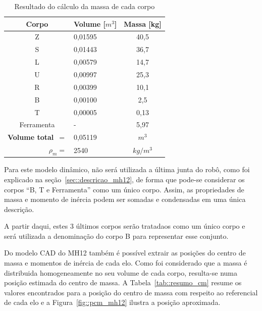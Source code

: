 \begin{table}[h]
\centering
\caption{Resultado do cálculo da massa de cada corpo}
\label{tab::massa_mh12}
\begin{tabular}{@{}clc@{}}
\toprule
\textbf{Corpo}                      & \textbf{Volume} [$m^3$] & \multicolumn{1}{l}{\textbf{Massa} [kg]} \\ \midrule 
Z 									& 0,01595         & 40,5							   \\
S                                   & 0,01443         & 36,7                               \\
L                                   & 0,00579         & 14,7                               \\
U                                   & 0,00997         & 25,3                               \\
R                                   & 0,00399         & 10,1                               \\
B                                   & 0,00100         & 2,5                                \\
T                                   & 0,00005         & 0,13                               \\
Ferramenta                          & -		          & 5,97							   \\ \midrule
\textbf{Volume total}~$=$           & 0,05119        & \multicolumn{1}{c}{$m^3$}	       \\
\multicolumn{1}{r}{\textbf{$\rho_m =$}} & 2540          &
\multicolumn{1}{c}{$kg/{m^3}$}     \\ \bottomrule
\end{tabular}
\end{table}
%

Para este modelo dinâmico, não será utilizada a última junta do robô, como foi
explicado na seção~\ref{sec::descricao_mh12}, de forma que pode-se considerar os
corpos ``B, T e Ferramenta'' como um único corpo. Assim, as propriedades de
massa e momento de inércia podem ser somadas e condensadas em uma única
descrição. 

A partir daqui, estes 3 últimos corpos serão tratadaos como um único corpo e
será utilizada a denominação do corpo B para representar esse conjunto.

Do modelo CAD do MH12 também é possível extrair as posições do centro de massa e
momentos de inércia de cada elo. Como foi considerado que a massa é distribuida
homogeneamente no seu volume de cada corpo, resulta-se numa posição estimada do
centro de massa. A Tabela~\ref{tab::resumo_cm} resume os valores encontrados
para a posição do centro de massa com respeito ao referencial de cada elo e a
Figura~\ref{fig::pcm_mh12} ilustra a posição aproximada.


